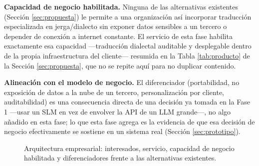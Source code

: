 \documentclass[11pt,a4paper]{article}
\begin{document}
\textbf{Capacidad de negocio habilitada.} Ninguna de las alternativas existentes (Sección \ref{sec:propuesta}) le permite a una organización así incorporar traducción especializada en jerga/dialecto sin exponer datos sensibles a un tercero o depender de conexión a internet constante. El servicio de esta fase habilita exactamente esa capacidad —traducción dialectal auditable y desplegable dentro de la propia infraestructura del cliente— resumida en la Tabla \ref{tab:producto} de la Sección \ref{sec:propuesta}, que no se repite aquí para no duplicar contenido.

\textbf{Alineación con el modelo de negocio.} El diferenciador (portabilidad, no exposición de datos a la nube de un tercero, personalización por cliente, auditabilidad) es una consecuencia directa de una decisión ya tomada en la Fase 1 —usar un SLM en vez de envolver la API de un LLM grande—, no algo añadido en esta fase; lo que esta fase agrega es la evidencia de que esa decisión de negocio efectivamente se sostiene en un sistema real (Sección \ref{sec:prototipo}).

\begin{figure}[h]
\centering
{}
\caption{Arquitectura empresarial: interesados, servicio, capacidad de negocio habilitada y diferenciadores frente a las alternativas existentes.}
\label{fig:arq-empresarial}
\end{figure}
\end{document}
